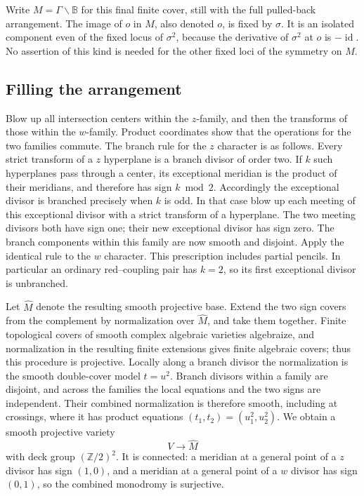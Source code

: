 \documentclass[11pt,reqno]{amsart}
\numberwithin{equation}{section}
\theoremstyle{definition}
\theoremstyle{remark}
\begin{document}
Write $M=\Gamma\backslash\mathbb B$ for this final finite cover, still with
the full pulled-back arrangement.  The image of $o$ in $M$, also denoted
$o$, is fixed by $\sigma$.  It is an isolated component even of the
fixed locus of $\sigma^2$, because the derivative of $\sigma^2$ at $o$
is $-\operatorname{id}$.  No assertion of this kind is needed for the other fixed
loci of the symmetry on $M$.

\subsection{Filling the arrangement}\label{geo:fill}

Blow up all intersection centers within the $z$-family, and then the
transforms of those within the $w$-family.  Product coordinates show
that the operations for the two families commute.  The branch rule
for the $z$ character is as follows.  Every strict transform of a
$z$ hyperplane is a branch divisor of order two.  If $k$ such
hyperplanes pass through a center, its exceptional meridian is the
product of their meridians, and therefore has sign $k\bmod2$.
Accordingly the exceptional divisor is branched precisely when $k$
is odd.  In that case blow up each meeting of this exceptional divisor
with a strict transform of a hyperplane.  The two meeting divisors
both have sign one; their new exceptional divisor has sign zero.
The branch components within this family are now smooth and disjoint.
Apply the identical rule to the $w$ character.  This prescription
includes partial pencils.  In particular an ordinary red--coupling
pair has $k=2$, so its first exceptional divisor is unbranched.

Let $\widehat M$ denote the resulting smooth projective base.  Extend
the two sign covers from the complement by normalization over
$\widehat M$, and take them together.  Finite topological covers of
smooth complex algebraic varieties algebraize, and normalization in
the resulting finite extensions gives finite algebraic covers; thus
this procedure is projective.  Locally along a branch divisor the
normalization is the smooth double-cover model $t=u^2$.  Branch
divisors within a family are disjoint, and across the families the
local equations and the two signs are independent.  Their combined
normalization is therefore smooth, including at crossings, where it
has product equations $(t_1,t_2)=(u_1^2,u_2^2)$.  We obtain a smooth
projective variety
\begin{equation}\label{geo:V}
                 V\longrightarrow\widehat M
\end{equation}
with deck group $(\mathbb Z/2)^2$.  It is connected: a meridian at a general
point of a $z$ divisor has sign $(1,0)$, and a meridian at a general
point of a $w$ divisor has sign $(0,1)$, so the combined monodromy is
surjective.
\end{document}
